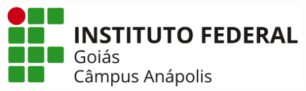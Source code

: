 \linespread{0.87}
\noindent\begin{minipage}[c][1.5cm][c]{3.5cm}
\includegraphics[width=1.5 \textwidth]{./outros/fig/IFGAnapolisHor2.png}
\end{minipage}\quad\quad\quad\qquad
\begin{minipage}{12cm}%
\scriptsize\textbf{\ministerio}\\
\textbf{\secretaria}\\
\textbf{\instituto}\\
\textbf{\MakeTextUppercase{\campus}}\\
\textbf{\biblioteca}\\
\end{minipage}
